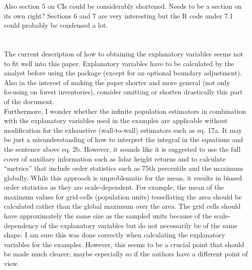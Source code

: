 \documentclass{article}
\begin{document}
Also section 5 on CIs could be considerably shortened. Needs to be a section on its own right? Sections 6 and 7 are very interesting but the R code under 7.1 could probably be condensed a lot.\\
\\
 \\

The current description of how to obtaining the explanatory variables seems not to fit well into this paper. Explanatory variables have to be calculated by the analyst before using the package (except for an optional boundary adjustment). Also in the interest of making the paper shorter and more general (not only focusing on forest inventories), consider omitting or shorten drastically this part of the document.\\

Furthermore, I wonder whether the infinite population estimators in combination with the explanatory variables used in the examples are applicable without modification for the exhaustive (wall-to-wall) estimators such as eq. 17a. It may be just a misunderstanding of how to interpret the integral in the equations and the sentence above eq. 2b. However, it sounds like it is suggested to use the full cover of auxiliary information such as lidar height returns and to calculate “metrics” that include order statistics such as 75th percentile and the maximum globally. While this approach is unproblematic for the mean, it results in biased order statistics as they are scale-dependent. For example, the mean of the maximum values for grid-cells (population units) tessellating the area should be calculated rather than the global maximum over the area. The grid cells should have approximately the same size as the sampled units because of the scale-dependency of the explanatory variables but do not necessarily be of the same shape. I am sure this was done correctly when calculating the explanatory variables for the examples. However, this seems to be a crucial point that should be made much clearer; maybe especially so if the authors have a different point of view.\\
\end{document}

